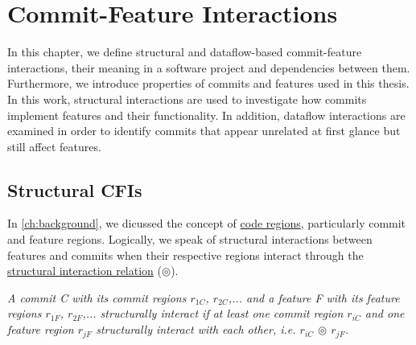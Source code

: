 \chapter{Commit-Feature Interactions}\label{ch:example_chapter}

In this chapter, we define structural and dataflow-based commit-feature interactions, their meaning in a software project and dependencies between them.
Furthermore, we introduce properties of commits and features used in this thesis. 
In this work, structural interactions are used to investigate how commits implement features and their functionality.
In addition, dataflow interactions are examined in order to identify commits that appear unrelated at first glance but still affect features. 

\section{Structural CFIs}\label{sec:structural_cfis}

In \autoref{ch:background}, we dicussed the concept of \hyperref[ch:code_regions]{code regions}, particularly commit and feature regions. 
Logically, we speak of structural interactions between features and commits when their respective regions interact through the \hyperref[def:structural_relation]{structural interaction relation} ($\circledcirc$).

\begin{definition}\label{def:structural_cfi}
\emph{A commit C with its commit regions $r_{1C}$, $r_{2C}$,... and a feature F with its feature regions $r_{1F}$, $r_{2F}$,... structurally interact if at least one commit region $r_{iC}$ and one feature region $r_{jF}$ structurally interact with each other, i.e. $r_{iC}$ $\circledcirc$ $r_{jF}$.}
\end{definition}


